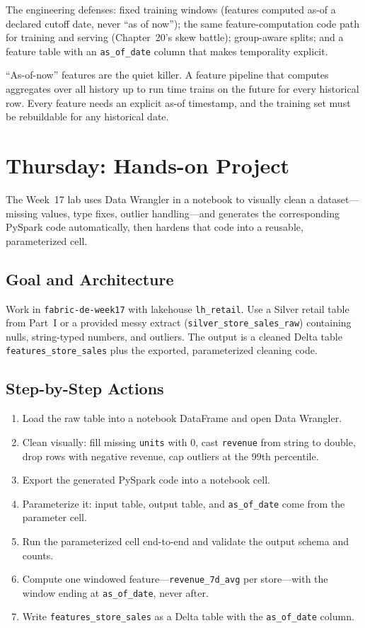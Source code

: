 The engineering defenses: fixed training windows (features computed as-of a declared cutoff date, never ``as of now''); the same feature-computation code path for training and serving (Chapter~20's skew battle); group-aware splits; and a feature table with an \texttt{as\_of\_date} column that makes temporality explicit.

\begin{pitfall}
``As-of-now'' features are the quiet killer. A feature pipeline that computes aggregates over all history up to run time trains on the future for every historical row. Every feature needs an explicit as-of timestamp, and the training set must be rebuildable for any historical date.
\end{pitfall}

\section{Thursday: Hands-on Project}
The Week~17 lab uses Data Wrangler in a notebook to visually clean a dataset---missing values, type fixes, outlier handling---and generates the corresponding PySpark code automatically, then hardens that code into a reusable, parameterized cell.

\subsection{Goal and Architecture}
Work in \texttt{fabric-de-week17} with lakehouse \texttt{lh\_retail}. Use a Silver retail table from Part~I or a provided messy extract (\texttt{silver\_store\_sales\_raw}) containing nulls, string-typed numbers, and outliers. The output is a cleaned Delta table \texttt{features\_store\_sales} plus the exported, parameterized cleaning code.

\subsection{Step-by-Step Actions}
\begin{enumerate}
    \item Load the raw table into a notebook DataFrame and open Data Wrangler.
    \item Clean visually: fill missing \texttt{units} with 0, cast \texttt{revenue} from string to double, drop rows with negative revenue, cap outliers at the 99th percentile.
    \item Export the generated PySpark code into a notebook cell.
    \item Parameterize it: input table, output table, and \texttt{as\_of\_date} come from the parameter cell.
    \item Run the parameterized cell end-to-end and validate the output schema and counts.
    \item Compute one windowed feature---\texttt{revenue\_7d\_avg} per store---with the window ending at \texttt{as\_of\_date}, never after.
    \item Write \texttt{features\_store\_sales} as a Delta table with the \texttt{as\_of\_date} column.
\end{enumerate}

